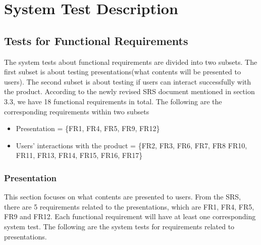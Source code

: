 \documentclass[12pt, titlepage]{article}
\begin{document}
\newpage

\section{System Test Description}
\subsection{Tests for Functional Requirements}
The system tests about functional requirements
are divided into two subsets. The first subset is about 
testing presentations(what
contents will be presented to users). The second subset is about
testing if users can interact successfully with the product.
According to the newly revised SRS document mentioned in section 3.3, we have
18 functional requirements in total. The following are the
corresponding requirements within  two subsets
\begin{itemize}
    \item Presentation = \{FR1, FR4, FR5, FR9, FR12\}
    \item Users' interactions with the product = \{FR2, FR3, FR6, FR7, FR8
    FR10, FR11, FR13, FR14, FR15, FR16, FR17\}
\end{itemize}
\subsubsection{Presentation}
This section focuses on what contents are presented to users. 
From the SRS, there are 5 requirements related to the presentations, which
are FR1, FR4, FR5, FR9 and FR12. Each functional requirement will have at least one 
corresponding system test. The following are the system tests for requirements
related to presentations.
\end{document}
